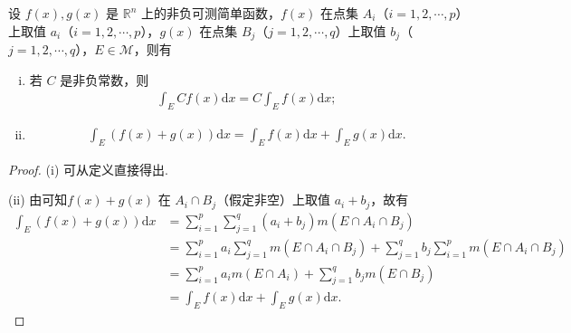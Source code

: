 \documentclass[../../main.tex]{subfiles}
\begin{document}
\begin{theorem}[积分的线性性质]\label{theorem:简单函数积分的线性性质}
设 \(f(x),g(x)\) 是 \(\mathbb{R}^n\) 上的非负可测简单函数，\(f(x)\) 在点集 \(A_i\)（\(i = 1,2,\cdots,p\)）上取值 \(a_i\)（\(i = 1,2,\cdots,p\)），\(g(x)\) 在点集 \(B_j\)（\(j = 1,2,\cdots,q\)）上取值 \(b_j\)（\(j = 1,2,\cdots,q\)），\(E\in\mathscr{M}\)，则有
\begin{enumerate}[(i)]
\item 若 \(C\) 是非负常数，则
\begin{align*}
\int_{E}Cf(x)\mathrm{d}x = C\int_{E}f(x)\mathrm{d}x;
\end{align*}
\item 
\begin{align*}
\int_{E}(f(x)+g(x))\mathrm{d}x=\int_{E}f(x)\mathrm{d}x+\int_{E}g(x)\mathrm{d}x.
\end{align*}
\end{enumerate}
\end{theorem}
\begin{proof}
(i) 可从定义直接得出.

(ii) 由可知\(f(x)+g(x)\) 在 \(A_i\cap B_j\)（假定非空）上取值 \(a_i + b_j\)，故有
\begin{align*}
\int_{E}(f(x)+g(x))\mathrm{d}x&=\sum_{i = 1}^{p}\sum_{j = 1}^{q}(a_i + b_j)m(E\cap A_i\cap B_j)\\
&=\sum_{i = 1}^{p}a_i\sum_{j = 1}^{q}m(E\cap A_i\cap B_j)+\sum_{j = 1}^{q}b_j\sum_{i = 1}^{p}m(E\cap A_i\cap B_j)\\
&=\sum_{i = 1}^{p}a_im(E\cap A_i)+\sum_{j = 1}^{q}b_jm(E\cap B_j)\\
&=\int_{E}f(x)\mathrm{d}x+\int_{E}g(x)\mathrm{d}x.
\end{align*} 

\end{proof}
\end{document}
